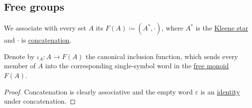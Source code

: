 \subsection{Free groups}\label{subsec:free_groups}

\begin{definition}\label{def:free_monoid}
  We associate with every set \( A \) its  \( F(A) \coloneqq (A^*, \cdot) \), where \( A^* \) is the \hyperref[def:formal_language/kleene_star]{Kleene star} and \( \cdot \) is \hyperref[def:formal_language/concatenation]{concatenation}.

  Denote by \( \iota_A: A \to F(A) \) the canonical inclusion function, which sends every member of \( A \) into the corresponding single-symbol word in the \hyperref[def:free_monoid]{free monoid} \( F(A) \).
\end{definition}
\begin{proof}
  Concatenation is clearly associative and the empty word \( \varepsilon \) is an \hyperref[def:monoid]{identity} under concatenation.
\end{proof}

